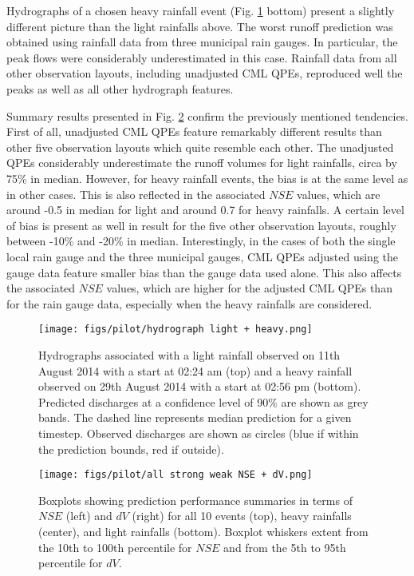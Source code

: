 \documentclass{ctuthesis}\usepackage[]{graphicx}\usepackage[]{color}
\begin{document}
Hydrographs of a chosen heavy rainfall event (Fig. \ref{pil_fig1} bottom) present a slightly different picture than the light rainfalls above. The worst runoff prediction was obtained using rainfall data from three municipal rain gauges. In particular, the peak flows were considerably underestimated in this case. Rainfall data from all other observation layouts, including unadjusted CML QPEs, reproduced well the peaks as well as all other hydrograph features.

Summary results presented in Fig. \ref{pil_fig2} confirm the previously mentioned tendencies. First of all, unadjusted CML QPEs feature remarkably different results than other five observation layouts which quite resemble each other. The unadjusted QPEs considerably underestimate the runoff volumes for light rainfalls, circa by 75\% in median. However, for heavy rainfall events, the bias is at the same level as in other cases. This is also reflected in the associated $N\!S\!E$ values, which are around -0.5 in median for light and around 0.7 for heavy rainfalls. A certain level of bias is present as well in result for the five other observation layouts, roughly between -10\% and -20\% in median. Interestingly, in the cases of both the single local rain gauge and the three municipal gauges, CML QPEs adjusted using the gauge data feature smaller bias than the gauge data used alone. This also affects the associated $N\!S\!E$ values, which are higher for the adjusted CML QPEs than for the rain gauge data, especially when the heavy rainfalls are considered.

\begin{figure}[H]
\begin{center}
\texttt{[image: figs/pilot/hydrograph light + heavy.png]}
\caption{Hydrographs associated with a light rainfall observed on 11th August 2014 with a start at 02:24 am (top) and a heavy rainfall observed on 29th August 2014 with a start at 02:56 pm (bottom). Predicted discharges at a confidence level of 90\% are shown as grey bands. The dashed line represents median prediction for a given timestep. Observed discharges are shown as circles (blue if within the prediction bounds, red if outside).} \label{pil_fig1}
\end{center}
\end{figure}



\begin{figure}[H]
\begin{center}
\texttt{[image: figs/pilot/all strong weak NSE + dV.png]}
\caption{Boxplots showing prediction performance summaries in terms of $N\!S\!E$ (left) and $dV$ (right) for all 10 events (top), heavy rainfalls (center), and light rainfalls (bottom). Boxplot whiskers extent from the 10th to 100th percentile for $N\!S\!E$ and from the 5th to 95th percentile for $dV$.} \label{pil_fig2}
\end{center}
\end{figure}
\end{document}
